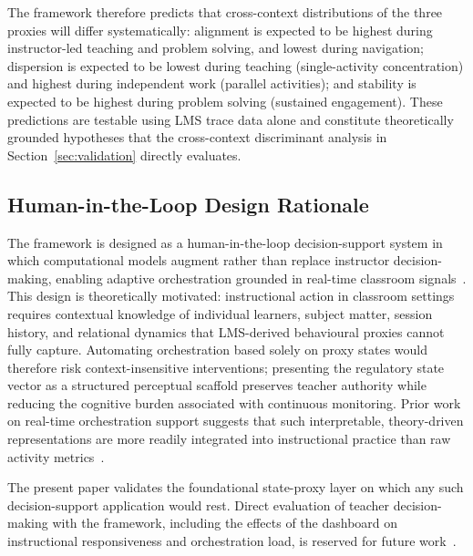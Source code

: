 \documentclass[preprint,12pt,authoryear]{elsarticle}
\begin{document}
The framework therefore predicts that cross-context distributions of the three proxies will differ systematically: alignment is expected to be highest during instructor-led teaching and problem solving, and lowest during navigation; dispersion is expected to be lowest during teaching (single-activity concentration) and highest during independent work (parallel activities); and stability is expected to be highest during problem solving (sustained engagement). These predictions are testable using LMS trace data alone and constitute theoretically grounded hypotheses that the cross-context discriminant analysis in Section~\ref{sec:validation} directly evaluates.

\subsection{Human-in-the-Loop Design Rationale}
\label{sec:hitl}

The framework is designed as a human-in-the-loop decision-support system in which computational models augment rather than replace instructor decision-making, enabling adaptive orchestration grounded in real-time classroom signals~\citep{holstein2019, molenaar2022}. This design is theoretically motivated: instructional action in classroom settings requires contextual knowledge of individual learners, subject matter, session history, and relational dynamics that LMS-derived behavioural proxies cannot fully capture. Automating orchestration based solely on proxy states would therefore risk context-insensitive interventions; presenting the regulatory state vector as a structured perceptual scaffold preserves teacher authority while reducing the cognitive burden associated with continuous monitoring. Prior work on real-time orchestration support suggests that such interpretable, theory-driven representations are more readily integrated into instructional practice than raw activity metrics~\citep{wise2019, cukurova2022, martinez2022}.

The present paper validates the foundational state-proxy layer on which any such decision-support application would rest. Direct evaluation of teacher decision-making with the framework, including the effects of the dashboard on instructional responsiveness and orchestration load, is reserved for future work~\citep{jarvela2023a}.
\end{document}
